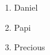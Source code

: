\documentclass{article}
\begin{document}
	
	\begin{enumerate}
		\item Daniel
		\item Papi
		\item Precious
	\end{enumerate}
\end{document}
